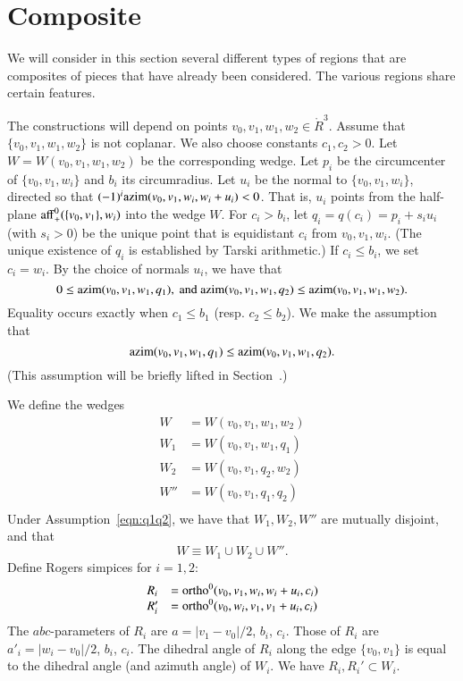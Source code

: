 \section{Composite}

We will consider in this section several different types
of regions that are composites of pieces that have already been
considered.  The various regions share certain features.

The constructions will depend on points
 $v_0,v_1,w_1,w_2\in\ring{R}^3$. Assume that $\{v_0,v_1,w_1,w_2\}$
is not coplanar.  We also choose constants $c_1,c_2>0$.
Let
$W=W(v_0,v_1,w_1,w_2)$ be the corresponding wedge.  
Let $p_i$ be the circumcenter of
$\{v_0,v_1,w_i\}$ and $b_i$ its circumradius.
Let $u_i$ be the normal to $\{v_0,v_1,w_i\}$, directed so that
$(-1)^i{\operatorname{azim}}(v_0,v_1,w_i,w_i+u_i) < 0$.  That is, $u_i$ points
from the half-plane ${\operatorname{aff}}_+^0(\{v_0,v_1\},w_i)$ into the wedge $W$.
For $c_i > b_i$, let $q_i = q(c_i) = p_i + s_i u_i$ (with $s_i>0$) be the
unique point that is equidistant $c_i$ from $v_0,v_1,w_i$.
(The unique existence of $q_i$ is established by Tarski arithmetic.)
If $c_i\le b_i$, we set $c_i=w_i$.
By the choice of normals $u_i$, we have that
 $$
 0\le {\operatorname{azim}}(v_0,v_1,w_1,q_1), \text{ and }
 {\operatorname{azim}}(v_0,v_1,w_1,q_2) \le {\operatorname{azim}}(v_0,v_1,w_1,w_2).
 $$
Equality occurs exactly when $c_1\le b_1$ (resp. $c_2\le b_2$).
We make the assumption that
\begin{equation}\tlabel{eqn:q1q2}
\op{azim}(v_0,v_1,w_1,q_1) \le \op{azim}(v_0,v_1,w_1,q_2).
\end{equation}
(This assumption will be briefly lifted in Section~.)

We define the wedges 
$$
   \begin{array}{lll}
   W &= W(v_0,v_1,w_1,w_2)\\
   W_1 &= W(v_0,v_1,w_1,q_1)\\
   W_2 &= W(v_0,v_1,q_2,w_2)\\
   W'' &= W(v_0,v_1,q_1,q_2)\\
   \end{array}
$$
Under Assumption~\ref{eqn:q1q2}, we have that
$W_1,W_2,W''$ are mutually disjoint, and that
   $$
   W \equiv W_1 \cup W_2 \cup W''.
   $$
Define Rogers simpices for $i=1,2$:
  $$
  \begin{array}{lll}
  R_i &= {\operatorname{ortho}}^0(v_0,v_1,w_i,w_i+u_i,c_i)\\
  R_i'&= {\operatorname{ortho}}^0(v_0,w_i,v_1,v_1+u_i,c_i)\\
  \end{array}
  $$
The $abc$-parameters of $R_i$ are $a=|v_1-v_0|/2$, $b_i$, $c_i$.
Those of $R_i$ are $a'_i=|w_i-v_0|/2$, $b_i$, $c_i$.
The dihedral angle of $R_i$ along the edge $\{v_0,v_1\}$ is
equal to the dihedral angle (and azimuth angle) of $W_i$.
We have $R_i,R_i'\subset W_i$.

